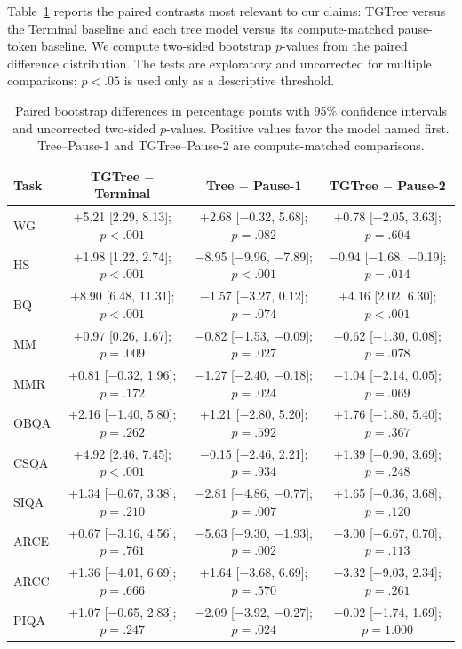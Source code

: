 \documentclass[11pt]{article}
\begin{document}
Table~\ref{tab:bootstrap-tests} reports the paired contrasts most relevant to our claims: TGTree versus the Terminal baseline and each tree model versus its compute-matched pause-token baseline. We compute two-sided bootstrap $p$-values from the paired difference distribution. The tests are exploratory and uncorrected for multiple comparisons; $p<.05$ is used only as a descriptive threshold.

\begin{table}[p]
  \centering
  \footnotesize
  \renewcommand{\arraystretch}{1.05}
  \setlength{\tabcolsep}{6pt}
  \begin{tabular}{lccc}
    \toprule
    Task & TGTree $-$ Terminal & Tree $-$ Pause-1 & TGTree $-$ Pause-2 \\
    \midrule
    WG   & +5.21 [2.29, 8.13]; $p<.001$ & +2.68 [$-$0.32, 5.68]; $p=.082$ & +0.78 [$-$2.05, 3.63]; $p=.604$ \\
    HS   & +1.98 [1.22, 2.74]; $p<.001$ & $-$8.95 [$-$9.96, $-$7.89]; $p<.001$ & $-$0.94 [$-$1.68, $-$0.19]; $p=.014$ \\
    BQ   & +8.90 [6.48, 11.31]; $p<.001$ & $-$1.57 [$-$3.27, 0.12]; $p=.074$ & +4.16 [2.02, 6.30]; $p<.001$ \\
    MM   & +0.97 [0.26, 1.67]; $p=.009$ & $-$0.82 [$-$1.53, $-$0.09]; $p=.027$ & $-$0.62 [$-$1.30, 0.08]; $p=.078$ \\
    MMR  & +0.81 [$-$0.32, 1.96]; $p=.172$ & $-$1.27 [$-$2.40, $-$0.18]; $p=.024$ & $-$1.04 [$-$2.14, 0.05]; $p=.069$ \\
    OBQA & +2.16 [$-$1.40, 5.80]; $p=.262$ & +1.21 [$-$2.80, 5.20]; $p=.592$ & +1.76 [$-$1.80, 5.40]; $p=.367$ \\
    CSQA & +4.92 [2.46, 7.45]; $p<.001$ & $-$0.15 [$-$2.46, 2.21]; $p=.934$ & +1.39 [$-$0.90, 3.69]; $p=.248$ \\
    SIQA & +1.34 [$-$0.67, 3.38]; $p=.210$ & $-$2.81 [$-$4.86, $-$0.77]; $p=.007$ & +1.65 [$-$0.36, 3.68]; $p=.120$ \\
    ARCE & +0.67 [$-$3.16, 4.56]; $p=.761$ & $-$5.63 [$-$9.30, $-$1.93]; $p=.002$ & $-$3.00 [$-$6.67, 0.70]; $p=.113$ \\
    ARCC & +1.36 [$-$4.01, 6.69]; $p=.666$ & +1.64 [$-$3.68, 6.69]; $p=.570$ & $-$3.32 [$-$9.03, 2.34]; $p=.261$ \\
    PIQA & +1.07 [$-$0.65, 2.83]; $p=.247$ & $-$2.09 [$-$3.92, $-$0.27]; $p=.024$ & $-$0.02 [$-$1.74, 1.69]; $p=1.000$ \\
    \bottomrule
  \end{tabular}
  \caption{Paired bootstrap differences in percentage points with 95\% confidence intervals and uncorrected two-sided $p$-values. Positive values favor the model named first. Tree--Pause-1 and TGTree--Pause-2 are compute-matched comparisons.}
  \label{tab:bootstrap-tests}
\end{table}
\end{document}
